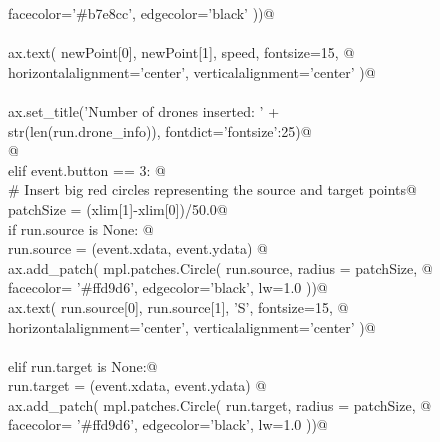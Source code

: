 \documentclass[12.0pt]{report}
\begin{document}
\begin{flushleft}
\begin{list}{}{}
\mbox{}\verb@                                                   facecolor='#b7e8cc', edgecolor='black'  ))@\\
\mbox{}\verb@@\\
\mbox{}\verb@                 ax.text( newPoint[0], newPoint[1], speed, fontsize=15, @\\
\mbox{}\verb@                          horizontalalignment='center', verticalalignment='center' )@\\
\mbox{}\verb@@\\
\mbox{}\verb@                 ax.set_title('Number of drones inserted: ' +\@\\
\mbox{}\verb@                              str(len(run.drone_info)), fontdict={'fontsize':25})@\\
\mbox{}\verb@                 @\\
\mbox{}\verb@             elif event.button == 3:  @\\
\mbox{}\verb@                 # Insert big red circles representing the source and target points@\\
\mbox{}\verb@                 patchSize  = (xlim[1]-xlim[0])/50.0@\\
\mbox{}\verb@                 if run.source is None:    @\\
\mbox{}\verb@                      run.source = (event.xdata, event.ydata)  @\\
\mbox{}\verb@                      ax.add_patch( mpl.patches.Circle( run.source, radius = patchSize, @\\
\mbox{}\verb@                                                        facecolor= '#ffd9d6', edgecolor='black', lw=1.0 ))@\\
\mbox{}\verb@                      ax.text( run.source[0], run.source[1], 'S', fontsize=15, @\\
\mbox{}\verb@                               horizontalalignment='center', verticalalignment='center' )@\\
\mbox{}\verb@@\\
\mbox{}\verb@                 elif run.target is None:@\\
\mbox{}\verb@                      run.target = (event.xdata, event.ydata)  @\\
\mbox{}\verb@                      ax.add_patch( mpl.patches.Circle( run.target, radius = patchSize, @\\
\mbox{}\verb@                                                       facecolor= '#ffd9d6', edgecolor='black', lw=1.0 ))@\\

\end{list}
\end{flushleft}
\end{document}
